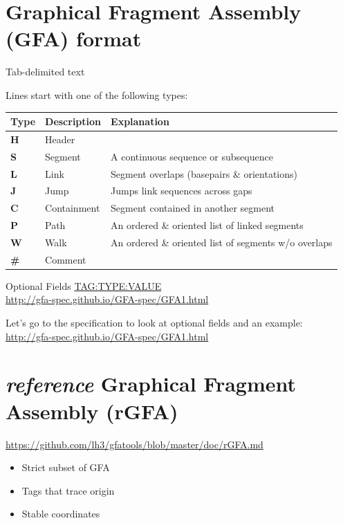 \documentclass[
]{book}
\providecommand{\tightlist}{%
  \setlength{\itemsep}{0pt}\setlength{\parskip}{0pt}}
\begin{document}
\hypertarget{graphical-fragment-assembly-gfa-format}{%
\section{Graphical Fragment Assembly (GFA) format}\label{graphical-fragment-assembly-gfa-format}}

Tab-delimited text

Lines start with one of the following types:

\begin{longtable}[]{@{}lll@{}}
\toprule()
Type & Description & Explanation \\
\midrule()
\endhead
\textbf{H} & Header & \\
\textbf{S} & Segment & A continuous sequence or subsequence \\
\textbf{L} & Link & Segment overlaps (basepairs \& orientations) \\
\textbf{J} & Jump & Jumps link sequences across gaps \\
\textbf{C} & Containment & Segment contained in another segment \\
\textbf{P} & Path & An ordered \& oriented list of linked segments \\
\textbf{W} & Walk & An ordered \& oriented list of segments w/o overlaps \\
\textbf{\#} & Comment & \\
\bottomrule()
\end{longtable}

Optional Fields \url{TAG:TYPE:VALUE}\\
\url{http://gfa-spec.github.io/GFA-spec/GFA1.html}

Let's go to the specification to look at optional fields and an example:\\
\url{http://gfa-spec.github.io/GFA-spec/GFA1.html}

\hypertarget{reference-graphical-fragment-assembly-rgfa}{%
\section{\texorpdfstring{\emph{reference} Graphical Fragment Assembly (rGFA)}{reference Graphical Fragment Assembly (rGFA)}}\label{reference-graphical-fragment-assembly-rgfa}}

\url{https://github.com/lh3/gfatools/blob/master/doc/rGFA.md}

\begin{itemize}
\tightlist
\item
  Strict subset of GFA
\item
  Tags that trace origin
\item
  Stable coordinates
\end{itemize}
\end{document}
